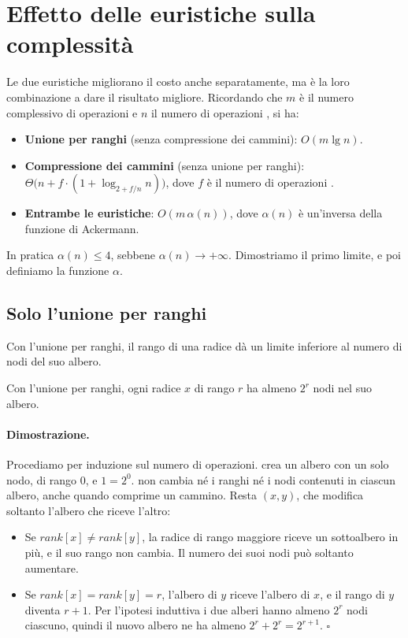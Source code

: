 \section{Effetto delle euristiche sulla complessità}\label{sec:uf-complessita}
Le due euristiche migliorano il costo anche separatamente, ma è la loro combinazione a dare il risultato migliore. Ricordando che $m$ è il numero complessivo di operazioni e $n$ il numero di operazioni \MakeSet{}, si ha:
\begin{itemize}
    \item \textbf{Unione per ranghi} (senza compressione dei cammini): $O(m \lg n)$.
    \item \textbf{Compressione dei cammini} (senza unione per ranghi): $\Theta\bigl(n + f \cdot (1 + \log_{2 + f/n} n)\bigr)$, dove $f$ è il numero di operazioni \FindSet{}.
    \item \textbf{Entrambe le euristiche}: $O(m\,\alpha(n))$, dove $\alpha(n)$ è un'inversa della funzione di Ackermann.
\end{itemize}

In pratica $\alpha(n) \le 4$, sebbene $\alpha(n) \to +\infty$. Dimostriamo il primo limite, e poi definiamo la funzione $\alpha$.

\subsection{Solo l'unione per ranghi}\label{sec:uf-solo-ranghi}
Con l'unione per ranghi, il rango di una radice dà un limite inferiore al numero di nodi del suo albero.

\begin{lemma}\label{lem:uf-rango}
Con l'unione per ranghi, ogni radice $x$ di rango $r$ ha almeno $2^r$ nodi nel suo albero.
\end{lemma}

\paragraph{Dimostrazione.}
Procediamo per induzione sul numero di operazioni. \MakeSet{} crea un albero con un solo nodo, di rango $0$, e $1 = 2^0$. \FindSet{} non cambia né i ranghi né i nodi contenuti in ciascun albero, anche quando comprime un cammino. Resta \Link$(x,y)$, che modifica soltanto l'albero che riceve l'altro:
\begin{itemize}
    \item Se $\mathit{rank}[x] \ne \mathit{rank}[y]$, la radice di rango maggiore riceve un sottoalbero in più, e il suo rango non cambia. Il numero dei suoi nodi può soltanto aumentare.
    \item Se $\mathit{rank}[x] = \mathit{rank}[y] = r$, l'albero di $y$ riceve l'albero di $x$, e il rango di $y$ diventa $r + 1$. Per l'ipotesi induttiva i due alberi hanno almeno $2^r$ nodi ciascuno, quindi il nuovo albero ne ha almeno $2^r + 2^r = 2^{r+1}$. \hfill $\square$
\end{itemize}

